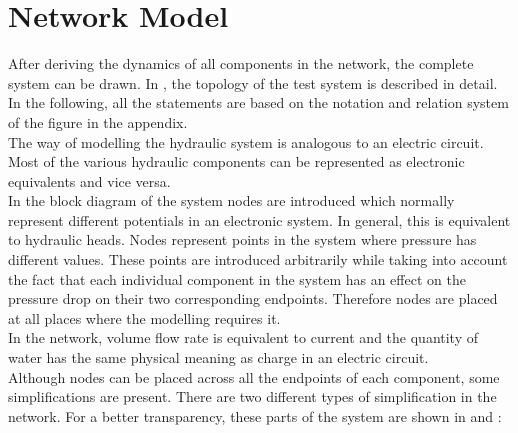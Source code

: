 \section{Network Model}  
\label{SystemModel}

After deriving the dynamics of all components in the network, the complete system can be drawn. In , the topology of the test system is described in detail. In the following, all the statements are based on the notation and relation system of the figure in the appendix. 
\\
The way of modelling the hydraulic system is analogous to an electric circuit. Most of the various hydraulic components can be represented as electronic equivalents and vice versa. 
\\
In the block diagram of the system nodes are introduced which  normally represent different potentials in an electronic system. In general, this is equivalent to hydraulic heads. Nodes represent points in the system where pressure has different values. These points are introduced arbitrarily while taking into account the fact that each individual component in the system has an effect on the pressure drop on their two corresponding endpoints. Therefore nodes are placed at all places where the modelling requires it. 
\\
In the network, volume flow rate is equivalent to current and the quantity of water has the same physical meaning as charge in an electric circuit. 
\\ 
Although nodes can be placed across all the endpoints of each component, some simplifications are present. There are two different types of simplification in the network. For a better transparency, these parts of the system are shown in  and : 


\begin{figure}[H]
\centering
\begin{minipage}{0.4\textwidth}
  \centering
   
  \label{fig:subsys_1}
\end{minipage}%
\begin{minipage}{0.4\textwidth}
  \centering
   
  \label{fig:subsys_2}
\end{minipage}
\end{figure}

